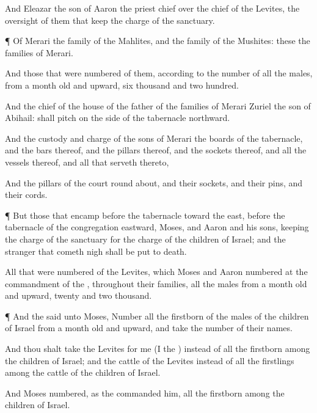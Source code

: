 {And
Eleazar the
son of
Aaron the
priest
{}
chief over the
chief of the
Levites,
{} the
oversight of them that
keep the
charge of the
sanctuary.


\par }{\PP {}¶ Of
Merari
{} the
family of the
Mahlites, and the
family of the
Mushites: these
{} the
families of
Merari.

And those that were
numbered of them, according to the
number of all the
males, from a
month
old and
upward,
{}
six
thousand and two
hundred.

And the
chief of the
house of the
father of the
families of
Merari
{}
Zuriel the
son of
Abihail:
{} shall
pitch on the
side of the
tabernacle
northward.

And
{} the
custody and
charge of the
sons of
Merari
{} the
boards of the
tabernacle, and the
bars thereof, and the
pillars thereof, and the
sockets thereof, and all the
vessels thereof, and all that
serveth thereto,

And the
pillars of the
court round
about, and their
sockets, and their
pins, and their
cords.


\par }{\PP {}¶ But those that
encamp
before the
tabernacle toward the
east,
{}
before the
tabernacle of the
congregation
eastward,
{}
Moses, and
Aaron and his
sons,
keeping the
charge of the
sanctuary for the
charge of the
children of
Israel; and the
stranger that cometh
nigh shall be put to
death.

All that were
numbered of the
Levites, which
Moses and
Aaron
numbered at the
commandment of the
{}, throughout their
families, all the
males from a
month
old and
upward,
{}
twenty and
two
thousand.


\par }{\PP {}¶ And the
{}
said unto
Moses,
Number all the
firstborn of the
males of the
children of
Israel from a
month
old and
upward, and
take the
number of their
names.

And thou shalt
take the
Levites for me (I
{} the
{}) instead of all the
firstborn among the
children of
Israel; and the
cattle of the
Levites instead of all the
firstlings among the
cattle of the
children of
Israel.

And
Moses
numbered, as the
{}
commanded him, all the
firstborn among the
children of
Israel.

}
